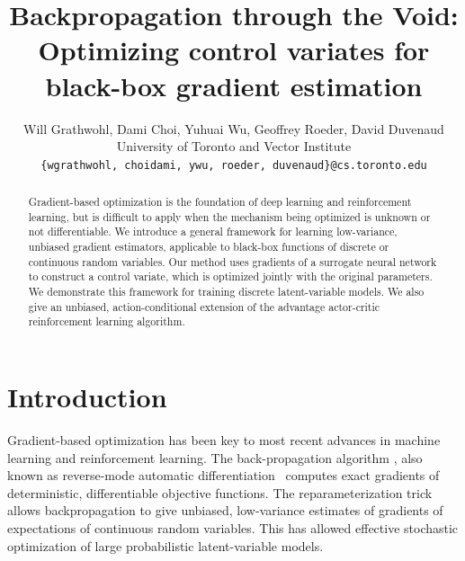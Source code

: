 \documentclass{article}
\title{Backpropagation through the Void:\\
Optimizing control variates for \\ black-box gradient estimation}
\author{Will Grathwohl, Dami Choi, Yuhuai Wu, Geoffrey Roeder, David Duvenaud \\
University of Toronto and Vector Institute\\
\texttt{\{wgrathwohl, choidami, ywu, roeder, duvenaud\}@cs.toronto.edu}
}
\begin{document}
\maketitle
\begin{abstract}
Gradient-based optimization is the foundation of deep learning and reinforcement learning, but is difficult to apply when the mechanism being optimized is unknown or not differentiable.
We introduce a general framework for learning low-variance, unbiased gradient estimators, applicable to black-box functions of discrete or continuous random variables.
Our method uses gradients of a surrogate neural network to construct a control variate, which is optimized jointly with the original parameters.
We demonstrate this framework for training discrete latent-variable models.
We also give an unbiased, action-conditional extension of the advantage actor-critic reinforcement learning algorithm.
\end{abstract}


\section{Introduction}
Gradient-based optimization has been key to most recent advances in machine learning and reinforcement learning.
The back-propagation algorithm \citep{rumelhart1986learning}, also known as reverse-mode automatic differentiation~\citep{speelpenning1980compiling, rall1981automatic} computes exact gradients of deterministic, differentiable objective functions.
The reparameterization trick \citep{williams1992simple, kingma2013autoencoding, rezende2014stochastic} allows backpropagation to give unbiased, low-variance estimates of gradients of expectations of continuous random variables.
This has allowed effective stochastic optimization of large probabilistic latent-variable models.
\end{document}
